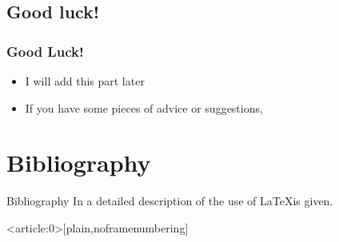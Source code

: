 \documentclass[light]{lutbeamer} %
\begin{document}
\subsection{Good luck!}

\begin{frame}
\frametitle{Good Luck!}
\begin{itemize}
\item I will add this part later
\item If you have some pieces of advice or suggestions,
\end{itemize}
\end{frame}


\appendix %



\section*{Bibliography}
\begin{frame}[fragile]{Bibliography}
In \cite{eu2020white} a detailed description of the use of \LaTeX is given.

\printbibliography
\end{frame}


{ %
    \begin{frame}<article:0>[plain,noframenumbering]
     \end{frame}
}
\end{document}
